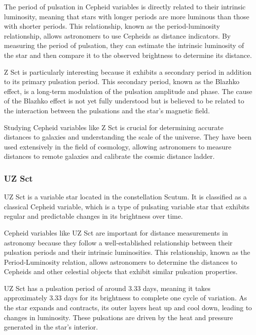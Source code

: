 The period of pulsation in Cepheid variables is directly related to their intrinsic luminosity, meaning that stars with longer periods are more luminous than those with shorter periods. This relationship, known as the period-luminosity relationship, allows astronomers to use Cepheids as distance indicators. By measuring the period of pulsation, they can estimate the intrinsic luminosity of the star and then compare it to the observed brightness to determine its distance.

Z Sct is particularly interesting because it exhibits a secondary period in addition to its primary pulsation period. This secondary period, known as the Blazhko effect, is a long-term modulation of the pulsation amplitude and phase. The cause of the Blazhko effect is not yet fully understood but is believed to be related to the interaction between the pulsations and the star's magnetic field.

Studying Cepheid variables like Z Sct is crucial for determining accurate distances to galaxies and understanding the scale of the universe. They have been used extensively in the field of cosmology, allowing astronomers to measure distances to remote galaxies and calibrate the cosmic distance ladder.





\subsubsection*{ UZ Sct }
UZ Sct is a variable star located in the constellation Scutum. It is classified as a classical Cepheid variable, which is a type of pulsating variable star that exhibits regular and predictable changes in its brightness over time.

Cepheid variables like UZ Sct are important for distance measurements in astronomy because they follow a well-established relationship between their pulsation periods and their intrinsic luminosities. This relationship, known as the Period-Luminosity relation, allows astronomers to determine the distances to Cepheids and other celestial objects that exhibit similar pulsation properties.

UZ Sct has a pulsation period of around 3.33 days, meaning it takes approximately 3.33 days for its brightness to complete one cycle of variation. As the star expands and contracts, its outer layers heat up and cool down, leading to changes in luminosity. These pulsations are driven by the heat and pressure generated in the star's interior.

